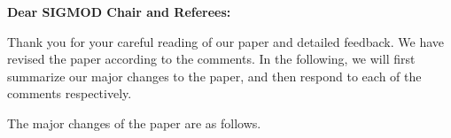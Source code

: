 
%

{\noindent \normalsize \bf Dear SIGMOD Chair and Referees: }

\vspace{1em}

Thank you for your careful reading of our paper and detailed feedback.
We have revised the paper according to the comments. 
In the following, we will first summarize our major changes to the paper, and then respond to each of the comments respectively.


\vspace{0.5em}
{\noindent The major changes of the paper are as follows.} %
